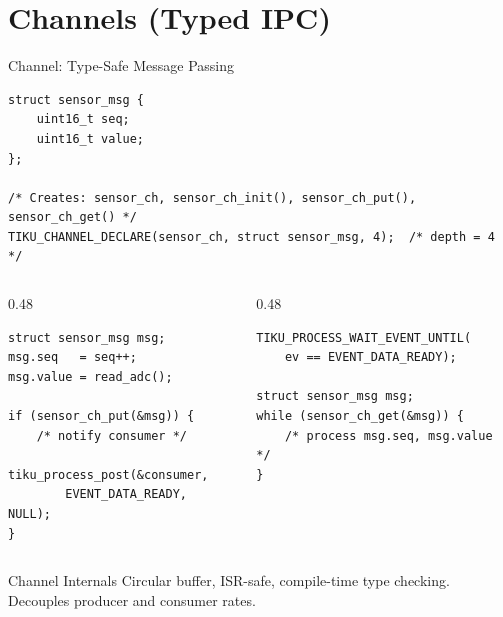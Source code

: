 \documentclass[aspectratio=169, 10pt]{beamer}
\begin{document}
\section{Channels (Typed IPC)}

\begin{frame}[fragile]{Channel: Type-Safe Message Passing}
\begin{lstlisting}[style=cstyle, title={Declare a channel}]
struct sensor_msg {
    uint16_t seq;
    uint16_t value;
};

/* Creates: sensor_ch, sensor_ch_init(), sensor_ch_put(), sensor_ch_get() */
TIKU_CHANNEL_DECLARE(sensor_ch, struct sensor_msg, 4);  /* depth = 4 */
\end{lstlisting}

\begin{columns}[T]
\begin{column}{0.48\textwidth}
\begin{lstlisting}[style=cstyle, title={Producer}]
struct sensor_msg msg;
msg.seq   = seq++;
msg.value = read_adc();

if (sensor_ch_put(&msg)) {
    /* notify consumer */
    tiku_process_post(&consumer,
        EVENT_DATA_READY, NULL);
}
\end{lstlisting}
\end{column}

\begin{column}{0.48\textwidth}
\begin{lstlisting}[style=cstyle, title={Consumer}]
TIKU_PROCESS_WAIT_EVENT_UNTIL(
    ev == EVENT_DATA_READY);

struct sensor_msg msg;
while (sensor_ch_get(&msg)) {
    /* process msg.seq, msg.value */
}
\end{lstlisting}
\end{column}
\end{columns}

\vspace{0.3em}
\begin{block}{Channel Internals}
Circular buffer, ISR-safe, compile-time type checking.
Decouples producer and consumer rates.
\end{block}
\end{frame}
\end{document}
